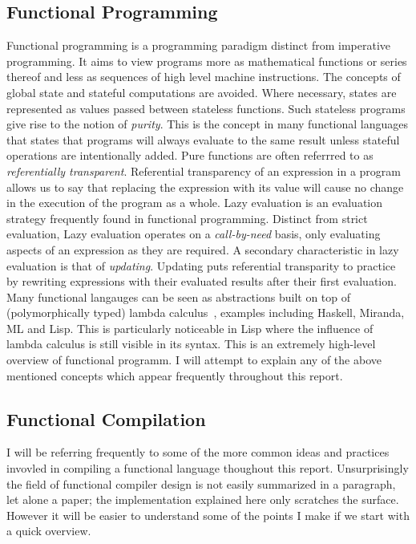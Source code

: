 \subsection{Functional Programming}
Functional programming is a programming paradigm distinct from imperative
programming. It aims to view programs more as mathematical functions or series
thereof and less as sequences of high level machine instructions. The concepts
of global state and stateful computations are avoided. Where necessary, states
are represented as values passed between stateless functions. Such stateless
programs give rise to the notion of \emph{purity}. This is the concept in many functional
languages that states that programs will always evaluate to the same result unless
stateful operations are intentionally added. Pure functions are often referrred
to as \emph{referentially transparent}. Referential transparency of an expression in a
program allows us to say that replacing the expression with its value will cause
no change in the execution of the program as a whole. Lazy evaluation is an
evaluation strategy frequently found in functional programming. Distinct from
strict evaluation, Lazy evaluation operates on a \emph{call-by-need} basis, only
evaluating aspects of an expression as they are required. A secondary characteristic
in lazy evaluation is that of \emph{updating}. Updating puts referential
transparity to practice by rewriting expressions with their evaluated results after
their first evaluation. Many functional langauges can be seen as abstractions built
on top of (polymorphically typed) lambda calculus~\cite[pp.10]{LC}, examples including 
Haskell, Miranda, ML and Lisp. This is particularly noticeable in Lisp where the 
influence of lambda calculus is still visible in its syntax. This is an extremely high-level
overview of functional programm. I will attempt to explain any of the above mentioned
concepts which appear frequently throughout this report. 

\subsection{Functional Compilation}
I will be referring frequently to some of the more common ideas and practices
invovled in compiling a functional language thoughout this report. Unsurprisingly
the field of functional compiler design is not easily summarized in a paragraph,
let alone a paper; the implementation explained here only scratches the surface.
However it will be easier to understand some of the points I make if we start
with a quick overview.

